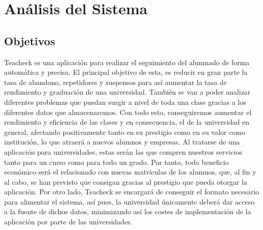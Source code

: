 \chapter{Análisis del Sistema}
\section{Objetivos}
Teacheck es una aplicación para realizar el seguimiento del alumnado de forma automática y precisa. El principal objetivo de esta, es reducir en gran parte la tasa de abandono, repetidores y suspensos para así aumentar la tasa de rendimiento y graduación de una universidad. También se van a poder analizar diferentes problemas que puedan surgir a nivel de toda una clase gracias a los diferentes datos que almacenaremos. Con todo esto, conseguiremos aumentar el rendimiento y eficiencia de las clases y en consecuencia, el de la universidad en general, afectando positivamente tanto en su prestigio como en su valor como institución, lo que atraerá a nuevos alumnos y empresas.  
Al tratarse de una aplicación para universidades, estas serán las que compren nuestros servicios tanto para un curso como para todo un grado. Por tanto,
todo beneficio económico será el relacionado con nuevas matrículas de los alumnos, que, al fin y al cabo, se han previsto que consigan gracias al prestigio que pueda otorgar la aplicación.
Por otro lado, Teacheck se encargará de conseguir el formato necesario para alimentar el sistema, así pues, la universidad únicamente deberá dar acceso a la fuente de dichos datos, minimizando así los costes de implementación de la aplicación por parte de las universidades.
